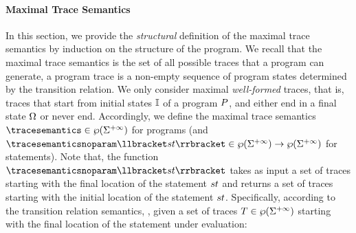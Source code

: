\paragraph{Maximal Trace Semantics}


In this section, we provide the \emph{structural} definition of the maximal trace semantics by induction on the structure of the program. We recall that the maximal trace semantics is the set of all possible traces that a program can generate, a program trace is a non-empty sequence of program states determined by the transition relation. We only consider maximal \emph{well-formed} traces, that is, traces that start from initial states $\mathbb{I}$ of a program $P$, and either end in a final state $\Omega$ or never end.
Accordingly, we define the maximal trace semantics $\tracesemantics\in\tracetype$ for programs (and $\tracesemanticsnoparam\semanticsof{\defstmt}\in\tracetype \to \tracetype$ for statements). Note that, the function $\tracesemanticsnoparam\semanticsof{\defstmt}$ takes as input a set of traces starting with the final location of the statement $st$ and returns a set of traces starting with the initial location of the statement $st$. Specifically, according to the transition relation semantics, \cf{} , given a set of traces $T\in\wp(\Sigma^{+\infty})$ starting with the final location of the statement under evaluation:


